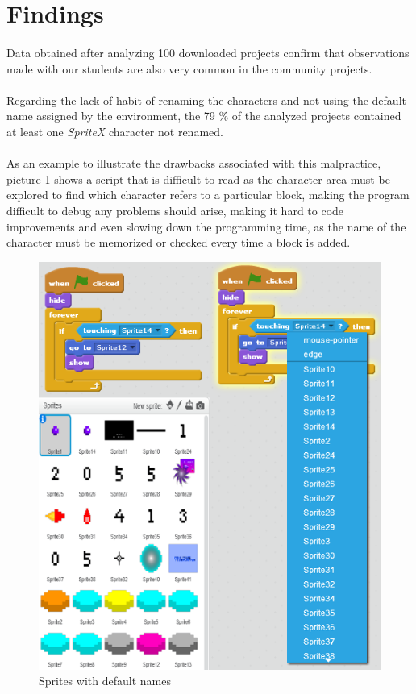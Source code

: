 \documentclass[a4paper,10pt]{article}
\begin{document}
\section{Findings}
\paragraph{}Data obtained after analyzing 100 downloaded projects confirm that observations made with our students are also very common in the community projects.
\paragraph{}Regarding the lack of habit of renaming the characters and not using the default name assigned by the environment, the 79 \% of the analyzed projects contained at least one \textit{SpriteX} character not renamed.
\paragraph{}As an example to illustrate the drawbacks associated with this malpractice, picture \ref{fig:SpriteNaming} shows a script that is difficult to read as the character area must be explored to find which character refers to a particular block, making the program difficult to debug any problems should arise, making it hard to code improvements and even slowing down the programming time, as the name of the character must be memorized or checked every time a block is added. 
\begin{figure}
  \centering
    \includegraphics{img/SpriteNaming.png}
  \caption{Sprites with default names}
  \label{fig:SpriteNaming}
\end{figure}
\end{document}
